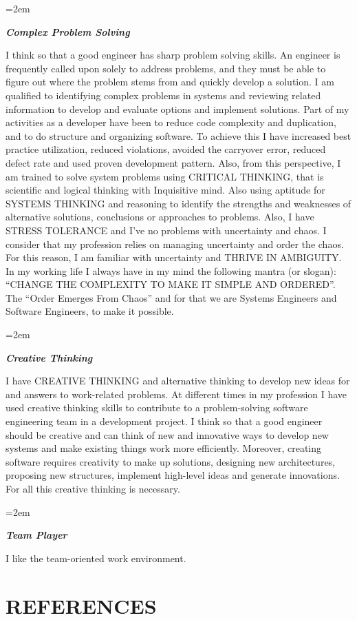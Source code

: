 \documentclass[paper=a4,fontsize=11pt]{scrartcl} %
\newlength{\spacebox}
\newcommand{\sepspace}{\vspace*{1em}}		%
\newcommand{\NewPart}[1]{\section*{\uppercase{#1}}}
\newcommand{\PersonalEntry}[2]{
		\noindent\hangindent=2em\hangafter=0 %
		\parbox{\spacebox}{        %
		\textit{#1}}		       %
		\hspace{1.5em} #2 \par}    %
\newcommand{\SkillsEntry}[2]{      %
		\noindent\hangindent=2em\hangafter=0 %
		\parbox{\spacebox}{        %
		\textit{#1}}			   %
		\hspace{1.5em} #2 \par}    %
\begin{document}
\SkillsEntry{\large{\textbf{Complex Problem Solving}}}{
I think so that a good engineer has sharp problem solving skills. An engineer is frequently called upon solely to address problems, and they must be able to figure out where the problem stems from and quickly develop a solution. I am qualified to identifying complex problems in systems and reviewing related information to develop and evaluate options and implement solutions. Part of my activities as a developer have been to reduce code complexity and duplication, and to do structure and organizing software. To achieve this I have increased best practice utilization, reduced violations, avoided the carryover error, reduced defect rate and used proven development pattern. Also, from this perspective, I am trained to solve system problems using CRITICAL THINKING, that is scientific and logical thinking with Inquisitive mind. Also using aptitude for SYSTEMS THINKING and reasoning to identify the strengths and weaknesses of alternative solutions, conclusions or approaches to problems. Also, I have STRESS TOLERANCE and I've no problems with uncertainty and chaos. I consider that my profession relies on managing uncertainty and order the chaos. For this reason, I am familiar with uncertainty and THRIVE IN AMBIGUITY. In my working life I always have in my mind the following mantra (or slogan): “CHANGE THE COMPLEXITY TO MAKE IT SIMPLE AND ORDERED”. The “Order Emerges From Chaos” and for that we are Systems Engineers and Software Engineers, to make it possible.
}

\sepspace

\SkillsEntry{\large{\textbf{Creative Thinking}}}{
I have CREATIVE THINKING and alternative thinking to develop new ideas for and answers to work-related problems. At different times in my profession I have used creative thinking skills to contribute to a problem-solving software engineering team in a development project. I think so that a good engineer should be creative and can think of new and innovative ways to develop new systems and make existing things work more efficiently. Moreover, creating software requires creativity to make up solutions, designing new architectures, proposing new structures, implement high-level ideas and generate innovations. For all this creative thinking is necessary.
}

\sepspace

\SkillsEntry{\large{\textbf{Team Player}}}{
I like the team-oriented work environment.
}


\NewPart{References}{}
\end{document}
